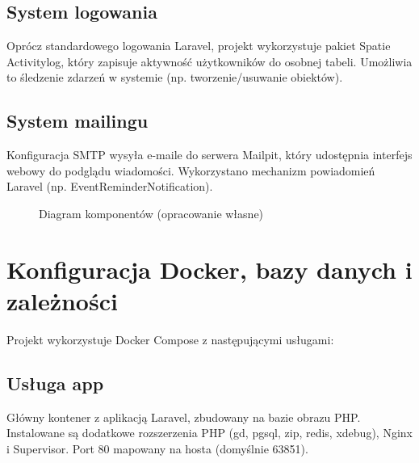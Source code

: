 \documentclass[12pt,a4paper]{article}
\begin{document}
\subsection{System logowania}

Oprócz standardowego logowania Laravel, projekt wykorzystuje pakiet Spatie Activitylog, który zapisuje aktywność użytkowników do osobnej tabeli. Umożliwia to śledzenie zdarzeń w systemie (np. tworzenie/usuwanie obiektów).

\subsection{System mailingu}

Konfiguracja SMTP wysyła e-maile do serwera Mailpit, który udostępnia interfejs webowy do podglądu wiadomości. Wykorzystano mechanizm powiadomień Laravel (np. EventReminderNotification).

\newpage

\begin{figure}[H]
    \centering
    \caption{Diagram komponentów (opracowanie własne)}
    \label{fig:diagram-klas}
\end{figure}

\newpage

\section{Konfiguracja Docker, bazy danych i zależności}

Projekt wykorzystuje Docker Compose z następującymi usługami:

\subsection{Usługa app}
Główny kontener z aplikacją Laravel, zbudowany na bazie obrazu PHP. Instalowane są dodatkowe rozszerzenia PHP (gd, pgsql, zip, redis, xdebug), Nginx i Supervisor. Port 80 mapowany na hosta (domyślnie 63851).
\end{document}

